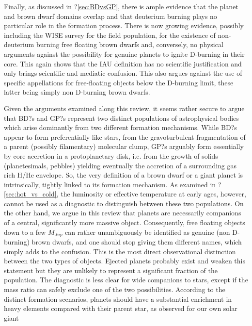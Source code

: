 Finally, as discussed in ?\ref{sec:BDvsGP}, there is ample evidence that the planet and brown dwarf domains overlap and that deuterium 
burning plays no particular role in the formation process. There is now growing evidence, possibly including the
WISE survey for the field population, for the existence of non-deuterium burning free floating brown dwarfs
and, conversely, no physical arguments against the possibility for genuine planets to ignite D-burning in their core.
This again shows that the IAU definition has no scientific justification and only brings scientific and mediatic 
confusion. This also argues against the use of specific appellations for free-floating objects below the D-burning limit, these
latter being simply non D-burning brown dwarfs.

Given the arguments examined along this review, it seems rather secure to argue that BD?s and GP?s represent 
two distinct populations of astrophysical bodies which arise dominantly from two different formation mechanisms.
While BD?s appear to form preferentially like stars, from the gravoturbulent fragmentation of a parent (possibly 
filamentary) molecular clump, GP?s arguably form essentially by core accretion in a protoplanetary disk, i.e. from the
growth of solids (planetesimals, pebbles) yielding eventually the accretion of a surrounding gas rich H/He envelope.
So, the very definition of a brown dwarf or a giant planet is intrinsically, tightly linked to its formation mechanism.
As examined in ?\ref{sec:hot_vs_cold}, the luminosity or effective temperature at early ages, however, cannot be used as a diagnostic
to distinguish between these two populations. On the other hand, we argue in this review that planets are necessarily
companions of a central, significantly more massive object. 
Consequently, free floating objects down to a few $M_{Jup}$ can rather unambiguously be identified as genuine (non D-burning) brown dwarfs, 
and one should stop giving them different names, which simply adds to the confusion. 
This is the most direct observational distinction between
the two types of objects. Ejected planets probably exist and weaken this statement but they are unlikely to represent
a significant fraction of the population. The diagnostic is less clear for wide companions to stars, except if the mass
ratio can safely exclude one of the two possibilities. According to the distinct formation scenarios, planets should
have a substantial enrichment in heavy elements compared with their parent star, as observed for our own solar giant
